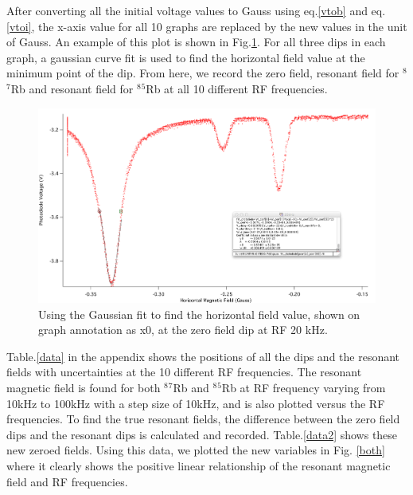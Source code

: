 \documentclass[prb,preprint]{revtex4-1}
\begin{document}
After converting all the initial voltage values to Gauss using eq.\ref{vtob} and eq.\ref{vtoi}, the x-axis value for all 10 graphs are replaced by the new values in the unit of Gauss. An example of this plot is shown in Fig.\ref{gau}. For all three dips in each graph, a gaussian curve fit is used to find the horizontal field value at the minimum point of the dip. From here, we record the zero field, resonant field for $^8$$^7$Rb and resonant field for $^8$$^5$Rb at all 10 different RF frequencies.\\

\begin{figure}[h]
\centering
\includegraphics[width=16cm]{gau}
\caption{Using the Gaussian fit to find the horizontal field value, shown on graph annotation as x0, at the zero field dip at RF 20 kHz.}
\label{gau}
\end{figure}


Table.\ref{data} in the appendix shows the positions of all the dips and the resonant fields with uncertainties at the 10 different RF frequencies. The resonant magnetic field is found for both $^8$$^7$Rb and $^8$$^5$Rb at RF frequency varying from 10kHz to 100kHz with a step size of 10kHz, and is also plotted versus the RF frequencies. To find the true resonant fields, the difference between the zero field dips and the resonant dips is calculated and recorded. Table.\ref{data2} shows these new zeroed fields. Using this data, we plotted the new variables in Fig. \ref{both} where it clearly shows the positive linear relationship of the resonant magnetic field and RF frequencies. \\
\end{document}
